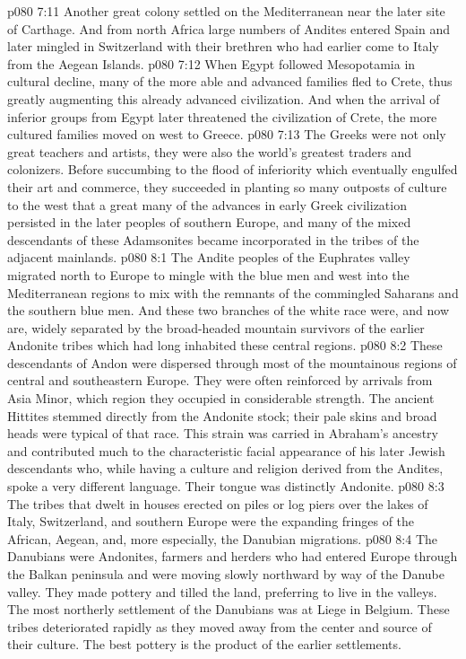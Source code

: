 \vs p080 7:11 \pc Another great colony settled on the Mediterranean near the later site of Carthage. And from north Africa large numbers of Andites entered Spain and later mingled in Switzerland with their brethren who had earlier come to Italy from the Aegean Islands.
\vs p080 7:12 \pc When Egypt followed Mesopotamia in cultural decline, many of the more able and advanced families fled to Crete, thus greatly augmenting this already advanced civilization. And when the arrival of inferior groups from Egypt later threatened the civilization of Crete, the more cultured families moved on west to Greece.
\vs p080 7:13 \pc The Greeks were not only great teachers and artists, they were also the world’s greatest traders and colonizers. Before succumbing to the flood of inferiority which eventually engulfed their art and commerce, they succeeded in planting so many outposts of culture to the west that a great many of the advances in early Greek civilization persisted in the later peoples of southern Europe, and many of the mixed descendants of these Adamsonites became incorporated in the tribes of the adjacent mainlands.
\vs p080 8:1 The Andite peoples of the Euphrates valley migrated north to Europe to mingle with the blue men and west into the Mediterranean regions to mix with the remnants of the commingled Saharans and the southern blue men. And these two branches of the white race were, and now are, widely separated by the broad\hyp{}headed mountain survivors of the earlier Andonite tribes which had long inhabited these central regions.
\vs p080 8:2 These descendants of Andon were dispersed through most of the mountainous regions of central and southeastern Europe. They were often reinforced by arrivals from Asia Minor, which region they occupied in considerable strength. The ancient Hittites stemmed directly from the Andonite stock; their pale skins and broad heads were typical of that race. This strain was carried in Abraham’s ancestry and contributed much to the characteristic facial appearance of his later Jewish descendants who, while having a culture and religion derived from the Andites, spoke a very different language. Their tongue was distinctly Andonite.
\vs p080 8:3 The tribes that dwelt in houses erected on piles or log piers over the lakes of Italy, Switzerland, and southern Europe were the expanding fringes of the African, Aegean, and, more especially, the Danubian migrations.
\vs p080 8:4 The Danubians were Andonites, farmers and herders who had entered Europe through the Balkan peninsula and were moving slowly northward by way of the Danube valley. They made pottery and tilled the land, preferring to live in the valleys. The most northerly settlement of the Danubians was at Liege in Belgium. These tribes deteriorated rapidly as they moved away from the center and source of their culture. The best pottery is the product of the earlier settlements.
